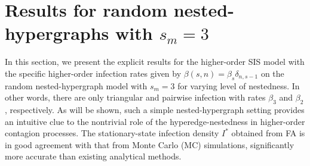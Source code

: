 \documentclass[aps,pre,twocolumn,nofootinbib,superscriptaddress,showpacs,showkeys]{revtex4-1}
\begin{document}
\section{Results for random nested-hypergraphs with $s_m=3$}
In this section, we present the explicit results for the higher-order SIS model with the specific higher-order infection rates given by $\beta(s,n)=\beta_{s}\delta_{n,s-1}$ \cite{SCM} on the random nested-hypergraph model with $s_m = 3$ for varying level of nestedness.
In other words, there are only triangular and pairwise infection with rates $\beta_3$ and $\beta_2$, respectively. 
As will be shown, such a simple nested-hypergraph setting provides an intuitive clue to the nontrivial role of the hyperedge-nestedness in higher-order contagion processes. 
The stationary-state infection density $I^*$ obtained from FA 
is in good agreement with that from Monte Carlo (MC) simulations, significantly more accurate than existing analytical methods. 
\end{document}
